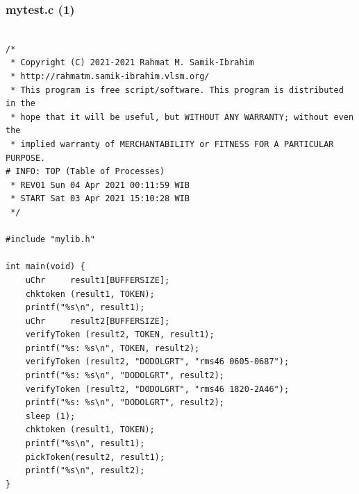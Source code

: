 \documentclass[xcolor=table, notheorems, hyperref={pdfpagelabels=false}]{beamer}
\begin{document}
\begin{frame}[fragile]
\frametitle{mytest.c (1)}
\begin{lstlisting}[basicstyle=\ttfamily\tiny]         % 108

/*
 * Copyright (C) 2021-2021 Rahmat M. Samik-Ibrahim
 * http://rahmatm.samik-ibrahim.vlsm.org/
 * This program is free script/software. This program is distributed in the 
 * hope that it will be useful, but WITHOUT ANY WARRANTY; without even the 
 * implied warranty of MERCHANTABILITY or FITNESS FOR A PARTICULAR PURPOSE.
# INFO: TOP (Table of Processes)
 * REV01 Sun 04 Apr 2021 00:11:59 WIB
 * START Sat 03 Apr 2021 15:10:28 WIB
 */

#include "mylib.h"

int main(void) {
    uChr     result1[BUFFERSIZE];
    chktoken (result1, TOKEN);
    printf("%s\n", result1);
    uChr     result2[BUFFERSIZE];
    verifyToken (result2, TOKEN, result1);
    printf("%s: %s\n", TOKEN, result2);
    verifyToken (result2, "DODOLGRT", "rms46 0605-0687");
    printf("%s: %s\n", "DODOLGRT", result2);
    verifyToken (result2, "DODOLGRT", "rms46 1820-2A46");
    printf("%s: %s\n", "DODOLGRT", result2);
    sleep (1);
    chktoken (result1, TOKEN);
    printf("%s\n", result1);
    pickToken(result2, result1);
    printf("%s\n", result2);
}

\end{lstlisting}
\end{frame}
\end{document}

